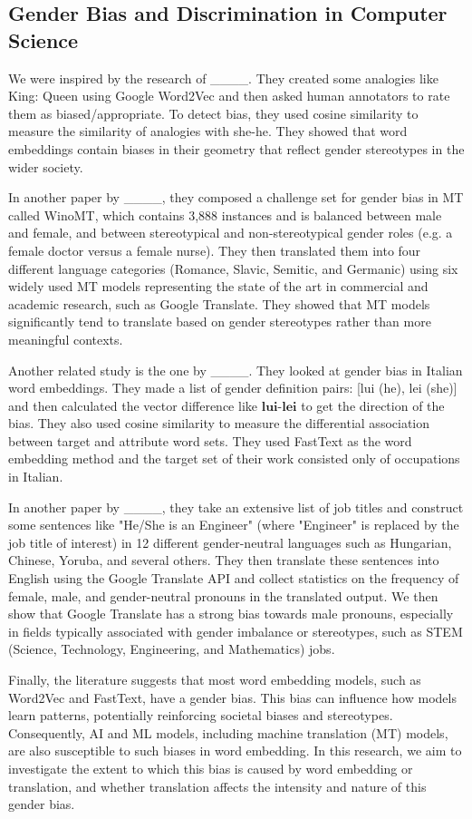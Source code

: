\subsection{Gender Bias and Discrimination in Computer Science}

We were inspired by the research of ____. They created some analogies like King: Queen using Google Word2Vec and then asked human annotators to rate them as biased/appropriate. To detect bias, they used cosine similarity to measure the similarity of analogies with she-he. They showed that word embeddings contain biases in their geometry that reflect gender stereotypes in the wider society. 

In another paper by ____, they composed a challenge set for gender bias in MT called WinoMT, which contains 3,888 instances and is balanced between male and female, and between stereotypical and non-stereotypical gender roles (e.g. a female doctor versus a female nurse). They then translated them into four different language categories (Romance, Slavic, Semitic, and Germanic) using six widely used MT models representing the state of the art in commercial and academic research, such as Google Translate. They showed that MT models significantly tend to translate based on gender stereotypes rather than more meaningful contexts.

Another related study is the one by ____. They looked at gender bias in Italian word embeddings. They made a list of gender definition pairs: [lui (he), lei (she)] and then calculated the vector difference like \(\mathbf{lui}\)-\(\mathbf{lei}\) to get the direction of the bias. They also used cosine similarity to measure the differential association between target and attribute word sets. They used FastText as the word embedding method and the target set of their work consisted only of occupations in Italian. 

In another paper by ____, they take an extensive list of job titles and construct some sentences like "He/She is an Engineer" (where "Engineer" is replaced by the job title of interest) in 12 different gender-neutral languages such as Hungarian, Chinese, Yoruba, and several others. They then translate these sentences into English using the Google Translate API and collect statistics on the frequency of female, male, and gender-neutral pronouns in the translated output. We then show that Google Translate has a strong bias towards male pronouns, especially in fields typically associated with gender imbalance or stereotypes, such as STEM (Science, Technology, Engineering, and Mathematics) jobs.

Finally, the literature suggests that most word embedding models, such as Word2Vec and FastText, have a gender bias. This bias can influence how models learn patterns, potentially reinforcing societal biases and stereotypes. Consequently, AI and ML models, including machine translation (MT) models, are also susceptible to such biases in word embedding. In this research, we aim to investigate the extent to which this bias is caused by word embedding or translation, and whether translation affects the intensity and nature of this gender bias.